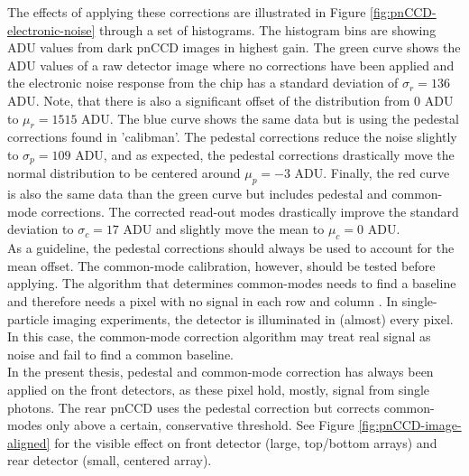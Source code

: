 %
The effects of applying these corrections are illustrated in Figure \ref{fig:pnCCD-electronic-noise} through a set of histograms. The histogram bins are showing ADU values from dark pnCCD images in highest gain. The green curve shows the ADU values of a raw detector image where no corrections have been applied and the electronic noise response from the chip has a standard deviation of $\sigma_{r}=136$ ADU. Note, that there is also a significant offset of the distribution from 0 ADU to $\mu_{r}=1515$ ADU. The blue curve shows the same data but is using the pedestal corrections found in 'calibman'. The pedestal corrections reduce the noise slightly to $\sigma_{p}=109$ ADU, and as expected, the pedestal corrections drastically move the normal distribution to be centered around $\mu_{p}=-3$ ADU. Finally, the red curve is also the same data than the green curve but includes pedestal and common-mode corrections. The corrected read-out modes drastically improve the standard deviation to $\sigma_{c}=17$ ADU and slightly move the mean to $\mu_{c}=0$ ADU.\\[1\baselineskip]
%
As a guideline, the pedestal corrections should always be used to account for the mean offset. The common-mode calibration, however, should be tested before applying. The algorithm that determines common-modes needs to find a baseline and therefore needs a pixel with no signal in each row and column  \citep{Hantke-Foucard-2016-PC}. In single-particle imaging experiments, the detector is illuminated in (almost) every pixel. In this case, the common-mode correction algorithm may treat real signal as noise and fail to find a common baseline.\\[1\baselineskip]
%
In the present thesis, pedestal and common-mode correction has always been applied on the front detectors, as these pixel hold, mostly, signal from single photons. The rear pnCCD uses the pedestal correction but corrects common-modes only above a certain, conservative threshold. See Figure \ref{fig:pnCCD-image-aligned} for the visible effect on front detector (large, top/bottom arrays) and rear detector (small, centered array).\\
%
%
%
%
%
%
